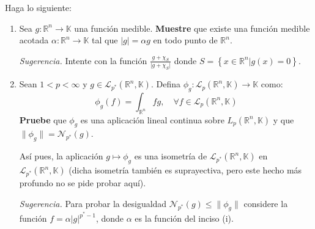 \documentclass[12pt]{report}
\theoremstyle{largebreak}
\newcommand\abs[1]{\ensuremath{\big|#1\big|}}
\newcommand\cf[3]{\ensuremath{#1:#2\rightarrow#3}}
\newcommand{\N}[2]{\ensuremath{\mathcal{N}_{#1}\left(#2\right)}}
\begin{document}
    \begin{excer}
        Haga lo siguiente:
        \begin{enumerate}
            \item Sea $\cf{g}{\mathbb{R}^n}{\mathbb{K}}$ una función medible. \textbf{Muestre} que existe una función medible acotada $\cf{\alpha}{\mathbb{R}^n}{\mathbb{K}}$ tal que $\abs{g}=\alpha g$ en todo punto de $\mathbb{R}^n$.
            
            \textit{Sugerencia.} Intente con la función $\frac{g+\chi_S}{\abs{g+\chi_S}}$ donde $S=\left\{x\in\mathbb{R}^n\Big|g(x)=0 \right\}$.

            \item Sean $1<p<\infty$ y $g\in\mathcal{L}_{p^*}(\mathbb{R}^n,\mathbb{K})$. Defina $\cf{\phi_g}{\mathcal{L}_p(\mathbb{R}^n,\mathbb{K})}{\mathbb{K}}$ como:
            \begin{equation*}
                \phi_g(f)=\int_{\mathbb{R}^n}fg,\quad\forall f\in\mathcal{L}_p(\mathbb{R}^n,\mathbb{K})
            \end{equation*}
            \textbf{Pruebe} que $\phi_g$ es una aplicación lineal continua sobre $L_p(\mathbb{R}^n,\mathbb{K})$ y que $\|\phi_g\|=\N{p^*}{g}$.

            Así pues, la aplicación $g\mapsto\phi_g$ es una isometría de $\mathcal{L}_{p^*}(\mathbb{R}^n,\mathbb{K})$ en $\mathcal{L}_{p^*}(\mathbb{R}^n,\mathbb{K})$ (dicha isometría también es suprayectiva, pero este hecho más profundo no se pide probar aquí).

            \textit{Sugerencia.} Para probar la desigualdad $\N{p^*}{g}\leq\|\phi_g\|$ considere la función $f=\alpha\abs{g}^{p^*-1}$, donde $\alpha$ es la función del inciso (i).


\end{enumerate}
\end{excer}
\end{document}
